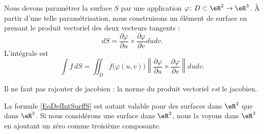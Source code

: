 Nous devons paramétrer la surface $S$ par une application $\varphi\colon D\subset\eR^2\to \eR^3$. À partir d'une telle paramétrisation, nous construisons un élément de surface en prenant le produit vectoriel des deux vecteurs tangents :
\begin{equation}
    dS=\frac{ \partial \varphi }{ \partial u }\times\frac{ \partial \varphi }{ \partial v }dudv.
\end{equation}
L'intégrale est
\begin{equation}        \label{EqDefIntSurffS}
    \int f\,dS=\iint_Df\big( \varphi(u,v) \big)\left\| \frac{ \partial \varphi }{ \partial u }\times\frac{ \partial \varphi }{ \partial v } \right\|dudv.
\end{equation}

Il ne faut pas rajouter de jacobien : la norme du produit vectoriel \emph{est} le jacobien.

\begin{remark}
    La formule \eqref{EqDefIntSurffS} est autant valable pour des surfaces dans $\eR^2$ que dans $\eR^3$. Si nous considérons une surface dans $\eR^2$, nous la voyons dans $\eR^3$ en ajoutant un zéro comme troisième composante.
\end{remark}

